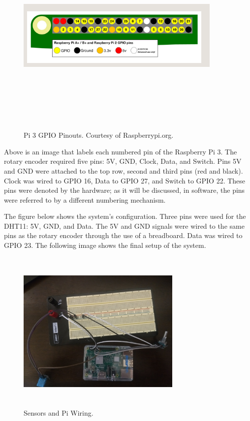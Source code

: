 \documentclass[letterpaper, 12pt]{article}
\begin{document}
~\newline
~\newline
\begin{figure}[H]
	\centering
	\includegraphics[width=10cm,height=10cm,keepaspectratio]{pi_GPIO.png}
	\caption[GPIO]{Pi 3 GPIO Pinouts. Courtesy of Raspberrypi.org.}
	\label{fig:GPIO}
\end{figure}

Above is an image that labels each numbered pin of the Raspberry Pi 3.
The rotary encoder required five pins: 5V, GND, Clock, Data, and Switch.  Pins 5V and GND were attached to the top row, second and third pins (red and black). Clock was wired to GPIO 16, Data to GPIO 27, and Switch to GPIO 22.  These pins were denoted by the hardware; as it will be discussed, in software, the pins were referred to by a different numbering mechanism.

The figure below shows the system's configuration.
Three pins were used for the DHT11: 5V, GND, and Data.  The 5V and GND signals were wired to the same pins as the rotary encoder through the use of a breadboard.  Data was wired to GPIO 23.  The following image shows the final setup of the system.
~\newline
\begin{figure}[H]
	\centering
	\includegraphics[width=8cm,height=8cm,keepaspectratio]{circuit.jpg}
	\caption[Circuit]{Sensors and Pi Wiring.}
	\label{fig:Circuit}
\end{figure}
\end{document}
